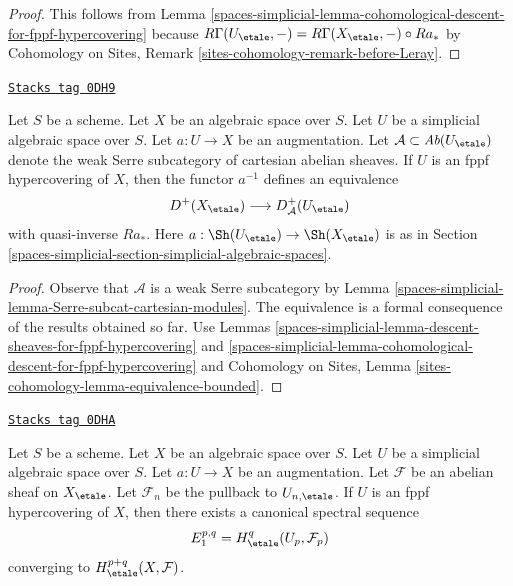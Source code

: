 \begin{proof}
This follows from
Lemma \ref{spaces-simplicial-lemma-cohomological-descent-for-fppf-hypercovering}
because $R\Gamma(U_\etale, -) = R\Gamma(X_\etale, -) \circ Ra_*$ by
Cohomology on Sites, Remark \ref{sites-cohomology-remark-before-Leray}.
\end{proof}

\begin{lemma}
\label{spaces-simplicial-lemma-fppf-hypercovering-equivalence-bounded}
\href{https://stacks.math.columbia.edu/tag/0DH9}{\texttt{Stacks tag 0DH9}}

Let $S$ be a scheme. Let $X$ be an algebraic space over $S$.
Let $U$ be a simplicial algebraic space over $S$. Let $a : U \to X$
be an augmentation.
Let $\mathcal{A} \subset \textit{Ab}(U_\etale)$
denote the weak Serre subcategory of cartesian abelian sheaves.
If $U$ is an fppf hypercovering of $X$, then
the functor $a^{-1}$ defines an equivalence
$$
D^+(X_\etale) \longrightarrow D_\mathcal{A}^+(U_\etale)
$$
with quasi-inverse $Ra_*$. Here $a : \Sh(U_\etale) \to \Sh(X_\etale)$
is as in Section \ref{spaces-simplicial-section-simplicial-algebraic-spaces}.
\end{lemma}

\begin{proof}
Observe that $\mathcal{A}$ is a weak Serre subcategory by
Lemma \ref{spaces-simplicial-lemma-Serre-subcat-cartesian-modules}.
The equivalence is a
formal consequence of the results obtained so far. Use
Lemmas \ref{spaces-simplicial-lemma-descent-sheaves-for-fppf-hypercovering} and
\ref{spaces-simplicial-lemma-cohomological-descent-for-fppf-hypercovering} and
Cohomology on Sites, Lemma \ref{sites-cohomology-lemma-equivalence-bounded}.
\end{proof}

\begin{lemma}
\label{spaces-simplicial-lemma-spectral-sequence-fppf-hypercovering}
\href{https://stacks.math.columbia.edu/tag/0DHA}{\texttt{Stacks tag 0DHA}}

Let $S$ be a scheme. Let $X$ be an algebraic space over $S$.
Let $U$ be a simplicial algebraic space over $S$. Let $a : U \to X$
be an augmentation. Let $\mathcal{F}$ be an abelian sheaf
on $X_\etale$. Let $\mathcal{F}_n$ be the pullback to $U_{n, \etale}$.
If $U$ is an fppf hypercovering of $X$, then
there exists a canonical spectral sequence
$$
E_1^{p, q} = H^q_\etale(U_p, \mathcal{F}_p)
$$
converging to $H^{p + q}_\etale(X, \mathcal{F})$.
\end{lemma}

